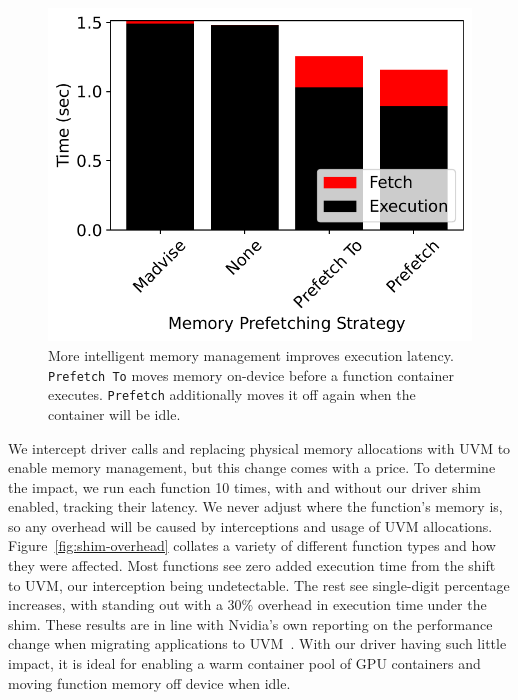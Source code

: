 \begin{figure}
  \centering
  \includegraphics{mqfq/graphs/mem-move/f16-i20-driver-mps-move.pdf}
  \caption{More intelligent memory management improves execution latency. 
    \texttt{Prefetch To} moves memory on-device before a function container executes.
    \texttt{Prefetch} additionally moves it off again when the container will be idle.}
    \label{fig:mem-prefetch}
\end{figure}


We intercept driver calls and replacing physical memory allocations with UVM to enable memory management, but this change comes with a price.
To determine the impact, we run each function 10 times, with and without our driver shim enabled, tracking their latency.
We never adjust where the function's memory is, so any overhead will be caused by interceptions and usage of UVM allocations.
Figure~\ref{fig:shim-overhead} collates a variety of different function types and how they were affected.
Most functions see zero added execution time from the shift to UVM, our interception being undetectable.
The rest see single-digit percentage increases, with  standing out with a 30\% overhead in execution time under the shim.
These results are in line with Nvidia's own reporting on the performance change when migrating applications to UVM~\cite{nvidia-uvm}.
With our driver having such little impact, it is ideal for enabling a warm container pool of GPU containers and moving function memory off device when idle.

